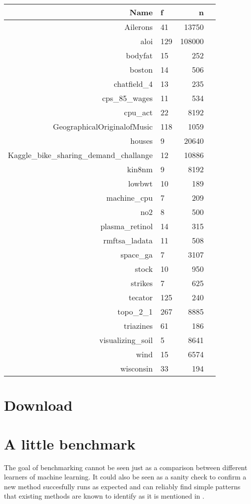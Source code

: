 \documentclass[a4paper]{article}
\begin{document}
\begin{table}[ht]
	\centering
	\begin{tabular}{rlrr}
		\hline
		 Name & f & n \\ 
		\hline
		 Ailerons &  41 & 13750 \\ 
		 aloi & 129 & 108000 \\ 
		 bodyfat &  15 & 252 \\ 
		 boston &  14 & 506 \\ 
		 chatfield\_4 &  13 & 235 \\ 
		 cps\_85\_wages &  11 & 534 \\ 
		 cpu\_act &  22 & 8192 \\ 
		 GeographicalOriginalofMusic & 118 & 1059 \\ 
		 houses &   9 & 20640 \\ 
		 Kaggle\_bike\_sharing\_demand\_challange &  12 & 10886 \\ 
		 kin8nm &   9 & 8192 \\ 
		 lowbwt &  10 & 189 \\ 
		 machine\_cpu &   7 & 209 \\ 
		 no2 &   8 & 500 \\ 
		 plasma\_retinol &  14 & 315 \\ 
		 rmftsa\_ladata &  11 & 508 \\ 
		 space\_ga &   7 & 3107 \\ 
		 stock &  10 & 950 \\ 
		 strikes &   7 & 625 \\ 
		 tecator & 125 & 240 \\ 
		 topo\_2\_1 & 267 & 8885 \\ 
		 triazines &  61 & 186 \\ 
		 visualizing\_soil &   5 & 8641 \\ 
		 wind &  15 & 6574 \\ 
		 wisconsin &  33 & 194 \\ 
		\hline
	\end{tabular}
\end{table}
\section{Download}

\section{A little benchmark}

The goal of benchmarking cannot be seen just as a comparison between different learners of machine learning.
It could also be seen as a sanity check to confirm a new method succesfully runs as expected and can reliably find simple patterns that existing methods are known to identify as it is mentioned in \citet{Hastie2009}. 
\end{document}
